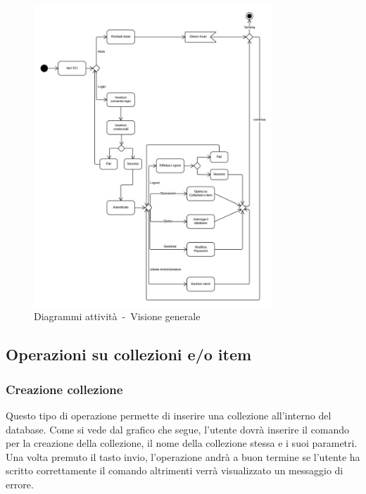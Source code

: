 \documentclass{scalatekids-article}
\begin{document}
\begin{figure}[H]
  \begin{center}
    \includegraphics[width=0.8\textwidth, keepaspectratio]{img/diagrammiAttivita/visioneGenerale.jpeg}
    \caption{Diagrammi attività\ -\ Visione generale}
  \end{center}
\end{figure}

\subsection{Operazioni su collezioni e/o item}
\subsubsection{Creazione collezione}

Questo tipo di operazione permette di inserire una collezione all'interno del
database. Come si vede dal grafico che segue, l'utente dovrà inserire il
comando per la creazione della collezione, il nome della collezione stessa e i
suoi parametri. Una volta premuto il tasto invio, l'operazione andrà a buon
termine se l'utente ha scritto correttamente il comando altrimenti verrà
visualizzato un messaggio di errore.
\end{document}
